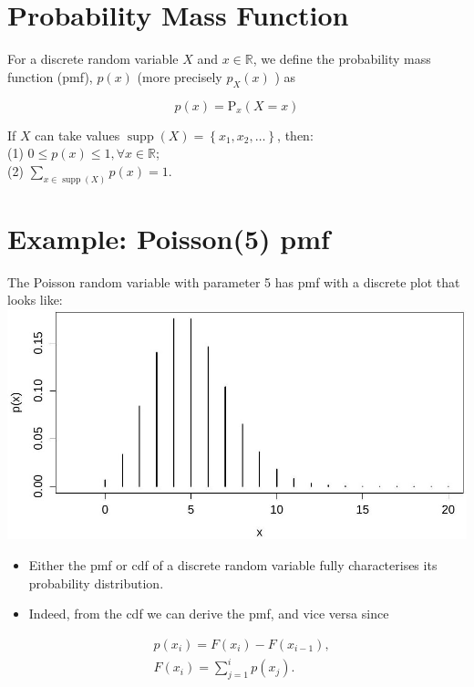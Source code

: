 \documentclass[10pt]{article}
\begin{document}
\section*{Probability Mass Function}
For a discrete random variable $X$ and $x \in \mathbb{R}$, we define the probability mass function (pmf), $p(x)$ (more precisely $p_{X}(x)$ ) as

$$
p(x)=\mathrm{P}_{x}(X=x)
$$

If $X$ can take values $\operatorname{supp}(X)=\left\{x_{1}, x_{2}, \ldots\right\}$, then:\\
(1) $0 \leq p(x) \leq 1, \forall x \in \mathbb{R}$;\\
(2) $\sum_{x \in \operatorname{supp}(X)} p(x)=1$.

\section*{Example: Poisson(5) pmf}
The Poisson random variable with parameter 5 has pmf with a discrete plot that looks like:\\
\includegraphics[max width=\textwidth, center]{2025_05_11_35704811148ad612caa6g-06}

\begin{itemize}
  \item Either the pmf or cdf of a discrete random variable fully characterises its probability distribution.
  \item Indeed, from the cdf we can derive the pmf, and vice versa since
\end{itemize}

$$
\begin{aligned}
& p\left(x_{i}\right)=F\left(x_{i}\right)-F\left(x_{i-1}\right), \\
& F\left(x_{i}\right)=\sum_{j=1}^{i} p\left(x_{j}\right) .
\end{aligned}
$$
\end{document}

